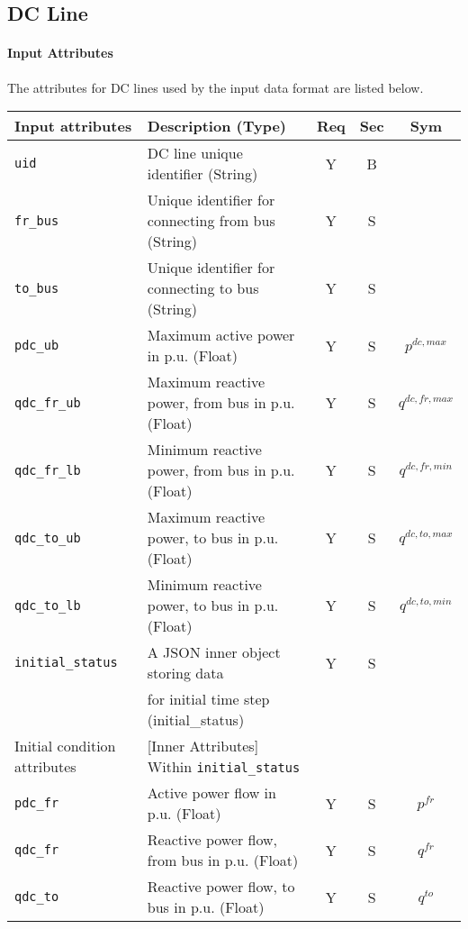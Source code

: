 \documentclass{article}
\begin{document}
\subsection{DC Line}
\label{nom:dcline}

\paragraph{Input Attributes}
The attributes for DC lines
used by the input data format are listed below.

\begin{center}
\small
\begin{tabular}{ l | l | c | c | c |}
Input attributes & Description (Type) & Req & Sec & Sym\\
\hline
  {\tt uid} & DC line unique identifier (String)& Y & B &  \\
  {\tt fr\_bus} & Unique identifier for connecting from bus (String) & Y & S & \\
  {\tt to\_bus} & Unique identifier for connecting to bus (String)& Y & S & \\
  {\tt pdc\_ub} & Maximum active power in p.u. (Float) & Y & S & $p^{dc,max}$\\
  {\tt qdc\_fr\_ub} & Maximum reactive power, from bus in p.u. (Float)& Y & S & $q^{dc,fr,max}$\\
  {\tt qdc\_fr\_lb} & Minimum reactive power, from bus in p.u. (Float)& Y & S & $q^{dc,fr,min}$\\
  {\tt qdc\_to\_ub} & Maximum reactive power, to bus in p.u. (Float)& Y & S & $q^{dc,to,max}$\\
  {\tt qdc\_to\_lb} & Minimum reactive power, to bus in p.u. (Float)& Y & S & $q^{dc,to,min}$\\
  {\tt initial\_status} & A JSON inner object storing data  & Y & S &  \\
       & for initial time step (initial\_status) &  &  &  \\
  \hline
  Initial condition attributes & [Inner Attributes] Within {\tt initial\_status} & & & \\
  \hline
  {\tt pdc\_fr} & Active power flow in p.u. (Float)& Y & S & $p^{fr}$ \\
  {\tt qdc\_fr} & Reactive power flow, from bus in p.u. (Float)& Y & S & $q^{fr}$ \\
  {\tt qdc\_to} & Reactive power flow, to bus in p.u. (Float)& Y & S & $q^{to}$ \\
  \hline
\end{tabular}
\end{center}
\end{document}
